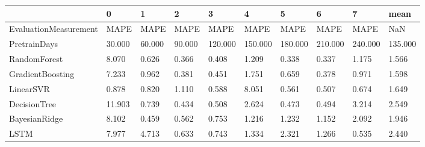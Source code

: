 \begin{tabular}{llllllllll}
\toprule
{} &      0 &      1 &      2 &       3 &       4 &       5 &       6 &       7 &    mean \\
\midrule
EvaluationMeasurement &   MAPE &   MAPE &   MAPE &    MAPE &    MAPE &    MAPE &    MAPE &    MAPE &     NaN \\
PretrainDays          & 30.000 & 60.000 & 90.000 & 120.000 & 150.000 & 180.000 & 210.000 & 240.000 & 135.000 \\
RandomForest          &  8.070 &  0.626 &  0.366 &   0.408 &   1.209 &   0.338 &   0.337 &   1.175 &   1.566 \\
GradientBoosting      &  7.233 &  0.962 &  0.381 &   0.451 &   1.751 &   0.659 &   0.378 &   0.971 &   1.598 \\
LinearSVR             &  0.878 &  0.820 &  1.110 &   0.588 &   8.051 &   0.561 &   0.507 &   0.674 &   1.649 \\
DecisionTree          & 11.903 &  0.739 &  0.434 &   0.508 &   2.624 &   0.473 &   0.494 &   3.214 &   2.549 \\
BayesianRidge         &  8.102 &  0.459 &  0.562 &   0.753 &   1.216 &   1.232 &   1.152 &   2.092 &   1.946 \\
LSTM                  &  7.977 &  4.713 &  0.633 &   0.743 &   1.334 &   2.321 &   1.266 &   0.535 &   2.440 \\
\bottomrule
\end{tabular}
